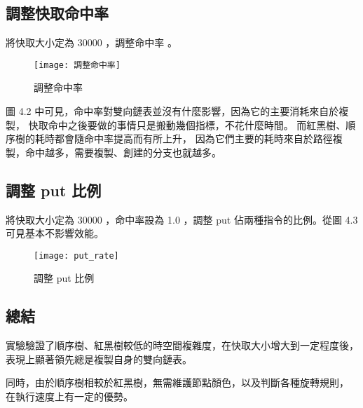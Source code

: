 \subsection{調整快取命中率}

將快取大小定為 30000 ，調整命中率 。

\begin{figure}[h!]
\texttt{[image: 調整命中率]}
\caption{調整命中率}
\end{figure}

圖 4.2 中可見，命中率對雙向鏈表並沒有什麼影響，因為它的主要消耗來自於複製，
快取命中之後要做的事情只是搬動幾個指標，不花什麼時間。
而紅黑樹、順序樹的耗時都會隨命中率提高而有所上升，
因為它們主要的耗時來自於路徑複製，命中越多，需要複製、創建的分支也就越多。

\subsection{調整 put 比例}

將快取大小定為 30000 ，命中率設為 1.0 ，調整 put 佔兩種指令的比例。從圖 4.3 可見基本不影響效能。

\begin{figure}[h!]
\texttt{[image: put\_rate]}
\caption{調整 put 比例}
\end{figure}


\subsection{總結}

實驗驗證了順序樹、紅黑樹較低的時空間複雜度，在快取大小增大到一定程度後，
表現上顯著領先總是複製自身的雙向鏈表。

同時，由於順序樹相較於紅黑樹，無需維護節點顏色，以及判斷各種旋轉規則，
在執行速度上有一定的優勢。